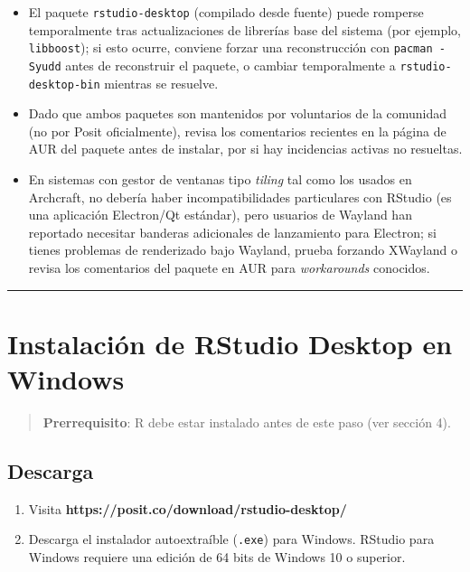 \documentclass[
  man,
  floatsintext,
  longtable,
  a4paper,
  nolmodern,
  notxfonts,
  notimes,
  12pt,
  colorlinks=true,linkcolor=blue,citecolor=blue,urlcolor=blue]{apa7}
\providecommand{\tightlist}{%
  \setlength{\itemsep}{0pt}\setlength{\parskip}{0pt}}
\begin{document}
\begin{itemize}
\tightlist
\item
  El paquete \texttt{rstudio-desktop} (compilado desde fuente) puede
  romperse temporalmente tras actualizaciones de librerías base del
  sistema (por ejemplo, \texttt{libboost}); si esto ocurre, conviene
  forzar una reconstrucción con \texttt{pacman\ -Syudd} antes de
  reconstruir el paquete, o cambiar temporalmente a
  \texttt{rstudio-desktop-bin} mientras se resuelve.
\item
  Dado que ambos paquetes son mantenidos por voluntarios de la comunidad
  (no por Posit oficialmente), revisa los comentarios recientes en la
  página de AUR del paquete antes de instalar, por si hay incidencias
  activas no resueltas.
\item
  En sistemas con gestor de ventanas tipo \emph{tiling} tal como los
  usados en Archcraft, no debería haber incompatibilidades particulares
  con RStudio (es una aplicación Electron/Qt estándar), pero usuarios de
  Wayland han reportado necesitar banderas adicionales de lanzamiento
  para Electron; si tienes problemas de renderizado bajo Wayland, prueba
  forzando XWayland o revisa los comentarios del paquete en AUR para
  \emph{workarounds} conocidos.
\end{itemize}

\begin{center}\rule{0.5\linewidth}{0.5pt}\end{center}

\section{Instalación de RStudio Desktop en
Windows}\label{instalaciuxf3n-de-rstudio-desktop-en-windows}

\begin{quote}
\textbf{Prerrequisito}: R debe estar instalado antes de este paso (ver
sección 4).
\end{quote}

\subsection{Descarga}\label{descarga}

\begin{enumerate}
\def\labelenumi{\arabic{enumi}.}
\tightlist
\item
  Visita \textbf{https://posit.co/download/rstudio-desktop/}
\item
  Descarga el instalador autoextraíble (\texttt{.exe}) para Windows.
  RStudio para Windows requiere una edición de 64 bits de Windows 10 o
  superior.
\end{enumerate}
\end{document}
